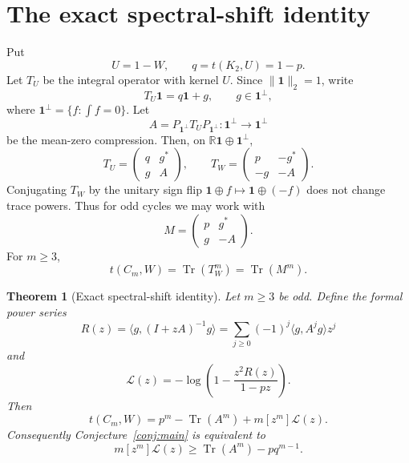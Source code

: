 \documentclass[11pt]{article}
\newtheorem{theorem}{Theorem}[section]
\newcommand{\one}{\mathbf 1}
\newcommand{\ip}[2]{\langle #1,#2\rangle}
\newcommand{\Tr}{\operatorname{Tr}}
\newcommand{\norm}[1]{\lVert #1\rVert}
\newcommand{\R}{\mathbb R}
\begin{document}
\section{The exact spectral-shift identity}

Put
\[
        U=1-W,
        \qquad q=t(K_2,U)=1-p.
\]
Let $T_U$ be the integral operator with kernel $U$.  Since $\norm{\one}_2=1$, write
\[
        T_U\one=q\one+g,
        \qquad g\in\one^\perp,
\]
where $\one^\perp=\{f:\int f=0\}$.  Let
\[
        A=P_{\one^\perp}T_UP_{\one^\perp}:\one^\perp\to\one^\perp
\]
be the mean-zero compression.  Then, on $\R\one\oplus\one^\perp$,
\begin{equation}\label{eq:block-TU-TW}
        T_U=\begin{pmatrix}q&g^*\\ g&A\end{pmatrix},
        \qquad
        T_W=\begin{pmatrix}p&-g^*\\ -g&-A\end{pmatrix}.
\end{equation}
Conjugating $T_W$ by the unitary sign flip $\one\oplus f\mapsto\one\oplus(-f)$ does not change trace powers.  Thus for odd cycles we may work with
\begin{equation}\label{eq:M-general}
        M=\begin{pmatrix}p&g^*\\ g&-A\end{pmatrix}.
\end{equation}
For $m\ge3$,
\[
        t(C_m,W)=\Tr(T_W^m)=\Tr(M^m).
\]

\begin{theorem}[Exact spectral-shift identity]\label{thm:spectral-shift}
Let $m\ge3$ be odd.  Define the formal power series
\begin{equation}\label{eq:R-L-def}
        R(z)=\ip{g}{(I+zA)^{-1}g}
        =\sum_{j\ge0}(-1)^j\ip{g}{A^j g}z^j
\end{equation}
and
\begin{equation}\label{eq:L-def}
        \mathcal L(z)=
        -\log\left(1-
        \frac{z^2R(z)}{1-pz}
        \right).
\end{equation}
Then
\begin{equation}\label{eq:spectral-shift}
        t(C_m,W)=p^m-\Tr(A^m)+m[z^m]\mathcal L(z).
\end{equation}
Consequently Conjecture~\ref{conj:main} is equivalent to
\begin{equation}\label{eq:spectral-shift-target}
        m[z^m]\mathcal L(z)\ge \Tr(A^m)-pq^{m-1}.
\end{equation}
\end{theorem}
\end{document}
